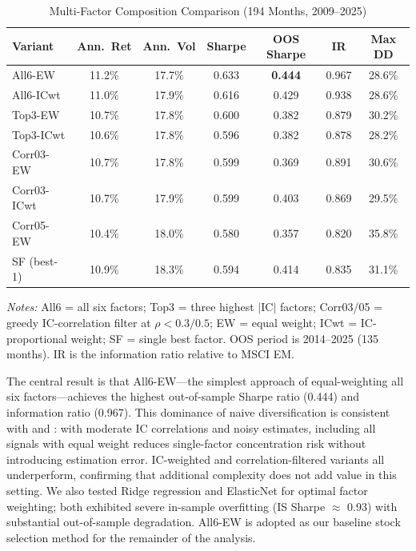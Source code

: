 \documentclass[12pt]{article}
\begin{document}
\begin{table}[H]
\centering
\caption{Multi-Factor Composition Comparison (194 Months, 2009--2025)}
\label{tab:composite}
\small
\begin{tabular}{lcccccc}
\toprule
\textbf{Variant} & \textbf{Ann.\ Ret} & \textbf{Ann.\ Vol} & \textbf{Sharpe} & \textbf{OOS Sharpe} & \textbf{IR} & \textbf{Max DD} \\
\midrule
All6-EW     & 11.2\% & 17.7\% & 0.633 & \textbf{0.444} & 0.967 & 28.6\% \\
All6-ICwt   & 11.0\% & 17.9\% & 0.616 & 0.429 & 0.938 & 28.6\% \\
Top3-EW     & 10.7\% & 17.8\% & 0.600 & 0.382 & 0.879 & 30.2\% \\
Top3-ICwt   & 10.6\% & 17.8\% & 0.596 & 0.382 & 0.878 & 28.2\% \\
Corr03-EW   & 10.7\% & 17.8\% & 0.599 & 0.369 & 0.891 & 30.6\% \\
Corr03-ICwt & 10.7\% & 17.9\% & 0.599 & 0.403 & 0.869 & 29.5\% \\
Corr05-EW   & 10.4\% & 18.0\% & 0.580 & 0.357 & 0.820 & 35.8\% \\
SF (best-1) & 10.9\% & 18.3\% & 0.594 & 0.414 & 0.835 & 31.1\% \\
\bottomrule
\end{tabular}
\begin{minipage}{0.92\textwidth}
\vspace{0.3em}
\footnotesize
\textit{Notes:} All6 = all six factors; Top3 = three highest $|$IC$|$ factors; Corr03/05 = greedy IC-correlation filter at $\rho < 0.3/0.5$; EW = equal weight; ICwt = IC-proportional weight; SF = single best factor. OOS period is 2014--2025 (135 months). IR is the information ratio relative to MSCI EM.
\end{minipage}
\end{table}

The central result is that All6-EW---the simplest approach of equal-weighting all six factors---achieves the highest out-of-sample Sharpe ratio (0.444) and information ratio (0.967). This dominance of naive diversification is consistent with \citet{demiguel2009} and \citet{asness2013}: with moderate IC correlations and noisy estimates, including all signals with equal weight reduces single-factor concentration risk without introducing estimation error. IC-weighted and correlation-filtered variants all underperform, confirming that additional complexity does not add value in this setting. We also tested Ridge regression and ElasticNet for optimal factor weighting; both exhibited severe in-sample overfitting (IS Sharpe $\approx$ 0.93) with substantial out-of-sample degradation. All6-EW is adopted as our baseline stock selection method for the remainder of the analysis.
\end{document}

